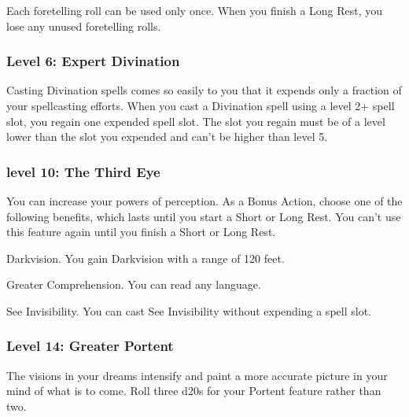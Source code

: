 \documentclass{article}
\begin{document}
Each foretelling roll can be used only once. When you finish a Long Rest, you lose any unused foretelling rolls.

\vspace{1em}

\subsubsection*{ Level 6: Expert Divination }

Casting Divination spells comes so easily to you that it expends only a fraction of your spellcasting efforts. When you cast a Divination spell using a level 2+ spell slot, you regain one expended spell slot. The slot you regain must be of a level lower than the slot you expended and can't be higher than level 5.

\vspace{1em}

\subsubsection*{ level 10: The Third Eye }

You can increase your powers of perception. As a Bonus Action, choose one of the following benefits, which lasts until you start a Short or Long Rest. You can't use this feature again until you finish a Short or Long Rest.

Darkvision. You gain Darkvision with a range of 120 feet.

Greater Comprehension. You can read any language.

See Invisibility. You can cast See Invisibility without expending a spell slot.

\vspace{1em}

\subsubsection*{ Level 14: Greater Portent }

The visions in your dreams intensify and paint a more accurate picture in your mind of what is to come. Roll three d20s for your Portent feature rather than two.

\vspace{1em}
\end{document}
